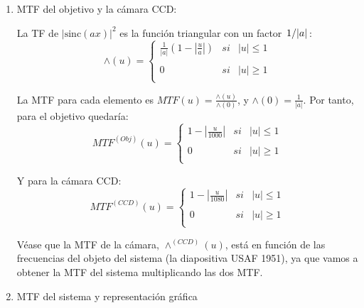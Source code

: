 \documentclass{./packages/optica-article}
\newcommand{\sinc}{\textrm{sinc}}
\begin{document}
\begin{enumerate}
		\begin{enumerate}
		    \item MTF del objetivo y la cámara CCD:
		    
		    La TF de $|\sinc(ax)|^2$ es la función triangular con un factor $\flatfrac{1}{|a|}$:
    		    \begin{equation}
    		        \wedge(u)= \left\{ \begin{array}{lcc}
                 \frac{1}{|a|}(1-|\frac{u}{a}|) &   si  & |u| \leq 1 \\
                 \\ 0 &  si & |u| \geq 1 \\
                 \end{array}
                \right.
		    \end{equation}
		    
		    La MTF para cada elemento es $MTF(u) = \frac{\wedge(u)}{\wedge(0)}$, y $\wedge(0) = \frac{1}{|a|}$. Por tanto, para el objetivo quedaría:
		        \begin{equation}
    		       MTF^{(Obj)}(u)= \left\{ \begin{array}{lcc}
                     1-|\frac{u}{1000}| &   si  & |u| \leq 1 \\
                     \\ 0 &  si & |u| \geq 1 \\
                     \end{array}
                    \right.
		    \end{equation}
		    
		    Y para la cámara CCD: 
		    	\begin{equation}
    		       MTF^{(CCD)}(u)= \left\{ \begin{array}{lcc}
                     1-|\frac{u}{1080}| &   si  & |u| \leq 1 \\
                     \\ 0 &  si & |u| \geq 1 \\
                     \end{array}
                    \right.
		    \end{equation}
		    
		    Véase que la MTF de la cámara, $\wedge^{(CCD)}(u)$, está en función de las frecuencias del objeto del sistema (la diapositiva USAF 1951), ya que vamos a obtener la MTF del sistema multiplicando las dos MTF.
		    
		    
		    \item MTF del sistema y representación gráfica
		    

\end{enumerate}
\end{enumerate}
\end{document}
